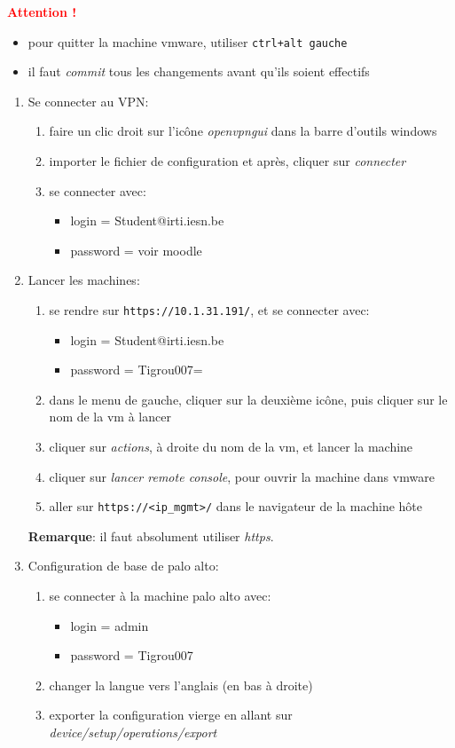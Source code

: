 \documentclass[a4paper]{article}
\begin{document}
\textcolor{red}{\textbf{Attention !}}
\begin{itemize}
    \item pour quitter la machine vmware, utiliser \texttt{ctrl+alt gauche}
    \item il faut \textit{commit} tous les changements avant qu'ils soient effectifs
\end{itemize}
\begin{enumerate}


\item Se connecter au VPN:
\begin{enumerate}
    \item faire un clic droit sur l'icône \textit{openvpngui} dans la barre d'outils windows
    \item importer le fichier de configuration et après, cliquer sur \textit{connecter}
    \item se connecter avec:
    \begin{itemize}
        \item login = Student@irti.iesn.be
        \item password = voir moodle
    \end{itemize}
\end{enumerate}


\item Lancer les machines:
\begin{enumerate}
    \item se rendre sur \texttt{https://10.1.31.191/}, et se connecter avec:
    \begin{itemize}
        \item login = Student@irti.iesn.be
        \item password = Tigrou007=
    \end{itemize}
    \item dans le menu de gauche, cliquer sur la deuxième icône, puis cliquer sur le nom de la vm à lancer
    \item cliquer sur \textit{actions}, à droite du nom de la vm, et lancer la machine
    \item cliquer sur \textit{lancer remote console}, pour ouvrir la machine dans vmware
    \item aller sur \texttt{https://<ip\_mgmt>/} dans le navigateur de la machine hôte
\end{enumerate}
\textbf{Remarque}: il faut absolument utiliser \textit{https}.


\item Configuration de base de palo alto:
\begin{enumerate}
    \item se connecter à la machine palo alto avec:
    \begin{itemize}
        \item login = admin
        \item password = Tigrou007
    \end{itemize}
    \item changer la langue vers l'anglais (en bas à droite)
    \item exporter la configuration vierge en allant sur \textit{device/setup/operations/export}
\end{enumerate}



\end{enumerate}
\end{document}
